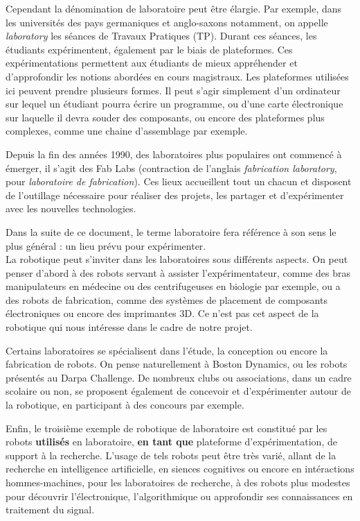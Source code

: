 \documentclass[a4paper,12pt]{report}
\begin{document}
Cependant la dénomination de laboratoire peut être élargie. 
Par exemple, dans les universités des pays germaniques et anglo-saxons notamment, on appelle \emph{laboratory} les séances de Travaux Pratiques (TP).
Durant ces séances, les étudiants expérimentent, également par le biais de plateformes.
Ces expérimentations permettent aux étudiants de mieux appréhender et d'approfondir les notions abordées en cours magistraux.
Les plateformes utilisées ici peuvent prendre plusieurs formes.
Il peut s'agir simplement d'un ordinateur sur lequel un étudiant pourra écrire un programme, 
ou d'une carte électronique sur laquelle il devra souder des composants, ou encore des plateformes plus complexes, comme une chaine d'assemblage par exemple.

Depuis la fin des années 1990, des laboratoires plus populaires ont commencé à émerger,
il s'agit des Fab Labs (contraction de l'anglais \emph{fabrication laboratory}, pour \emph{laboratoire de fabrication}).
Ces lieux accueillent tout un chacun et disposent de l'outillage nécessaire pour réaliser des projets, les partager et d'expérimenter avec les nouvelles technologies.

Dans la suite de ce document, le terme laboratoire fera référence à son sens le plus général : un lieu prévu pour expérimenter.\\

La robotique peut s'inviter dans les laboratoires sous différents aspects.
On peut penser d'abord à des robots servant à assister l'expérimentateur, comme des bras manipulateurs en médecine ou des centrifugeuses en biologie par exemple, 
ou a des robots de fabrication, comme des systèmes de placement de composants électroniques ou encore des imprimantes 3D.
Ce n'est pas cet aspect de la robotique qui nous intéresse dans le cadre de notre projet.

Certains laboratoires se spécialisent dans l'étude, la conception ou encore la fabrication de robots.
On pense naturellement à Boston Dynamics, ou les robots présentés au Darpa Challenge. 
De nombreux clubs ou associations, dans un cadre scolaire ou non, se proposent également de concevoir et d'expérimenter autour de la robotique, 
en participant à des concours par exemple.

Enfin, le troisième exemple de robotique de laboratoire est constitué par les robots \textbf{utilisés} en laboratoire, 
\textbf{en tant que} plateforme d'expérimentation, de support à la recherche.
L'usage de tels robots peut être très varié, allant de la recherche en intelligence artificielle, 
en siences cognitives ou encore en intéractions hommes-machines, pour les laboratoires de recherche, 
à des robots plus modestes pour découvrir l'électronique, l'algorithmique ou approfondir ses connaissances en traitement du signal.
\end{document}
